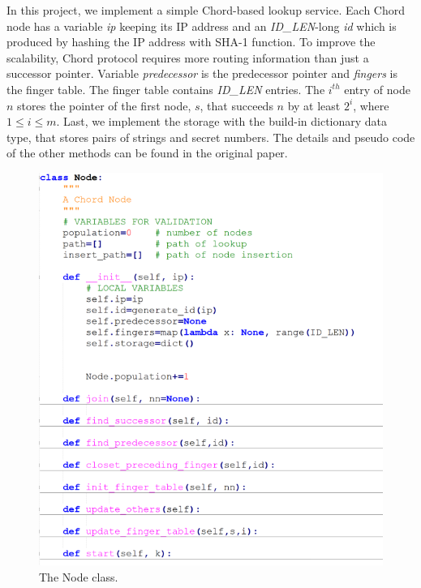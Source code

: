 \documentclass{article}
\begin{document}
In this project, we implement a simple Chord-based lookup service. Each Chord node has a variable \textit{ip} keeping its IP address and an \textit{ID\_LEN}-long \textit{id} which is produced by hashing the IP address with SHA-1 function. To improve the scalability, Chord protocol requires more routing information than just a successor pointer. Variable \textit{predecessor} is the predecessor pointer and \textit{fingers} is the finger table. The finger table contains \textit{ID\_LEN} entries. The $i^{th}$ entry of node $n$ stores the pointer of the first node, $s$, that succeeds $n$ by at least $2^i$, where $1 \leq i \leq m$. Last, we implement the storage with the build-in dictionary data type, that stores pairs of strings and secret numbers. The details and pseudo code of the other methods can be found in the original paper.
\begin{figure}[H]
\centering
\includegraphics[scale=1.5]{Node.PNG}
\caption{The Node class.
\label{node}}
\end{figure}
\end{document}
